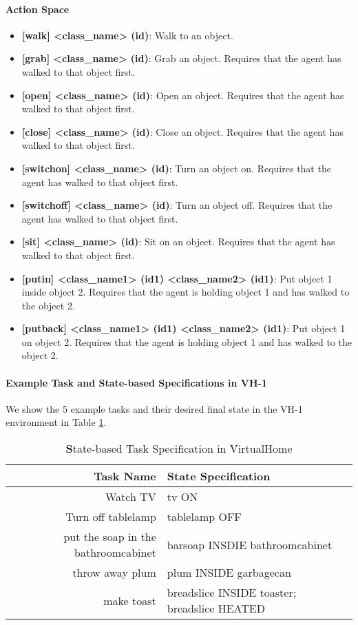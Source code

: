 \paragraph{Action Space}
\begin{itemize}
    \item \textbf{[walk] <class\_name> (id)}: Walk to an object. 
    \item \textbf{[grab] <class\_name> (id)}: Grab an object. Requires that the agent has walked to that object first.
    \item \textbf{[open] <class\_name> (id)}: Open an object. Requires that the agent has walked to that object first.
    \item \textbf{[close] <class\_name> (id)}: Close an object. Requires that the agent has walked to that object first.
    \item \textbf{[switchon] <class\_name> (id)}: Turn an object on. Requires that the agent has walked to that object first.
    \item \textbf{[switchoff] <class\_name> (id)}: Turn an object off. Requires that the agent has walked to that object first.
    \item \textbf{[sit] <class\_name> (id)}: Sit on an object. Requires that the agent has walked to that object first.
    \item \textbf{[putin] <class\_name1> (id1) <class\_name2> (id1)}: Put object 1 inside object 2. Requires that the agent is holding object 1 and has walked to the object 2.
    \item \textbf{[putback] <class\_name1> (id1) <class\_name2> (id1)}: Put object 1 on object 2. Requires that the agent is holding object 1 and has walked to the object 2.
\end{itemize}

\paragraph{Example Task and State-based Specifications in VH-1}
We show the 5 example tasks and their desired final state in the VH-1 environment in Table \ref{tab:VHEgTasks}.
\begin{table}[h!]
    \centering
    \begin{tabular}{r l}
        \toprule[1.5pt]
              \textbf{Task Name} & \textbf{State Specification }
              \\
              \hline
             Watch TV & tv ON \\
             Turn off tablelamp & tablelamp OFF \\
             put the soap in the bathroomcabinet & barsoap INSDIE bathroomcabinet \\
             throw away plum & plum INSIDE garbagecan \\
             make toast & breadslice INSIDE toaster; breadslice HEATED \\
         \bottomrule[1.5pt]
    \end{tabular}
    \caption{\textbf State-based Task Specification in VirtualHome}
    \label{tab:VHEgTasks}
\end{table}



